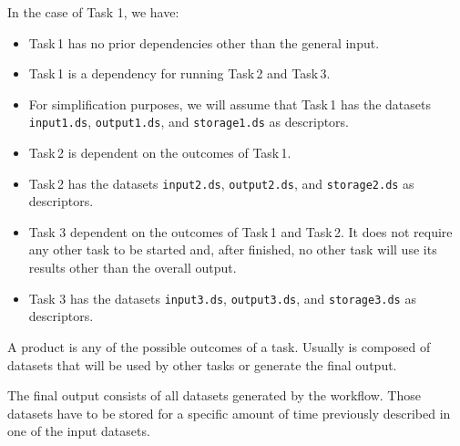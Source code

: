 \documentclass[a4paper]{article}
\begin{document}
{{{{\begin{description}
In the case of Task 1, we have:

\begin{itemize}

\item Task\,1 has no prior dependencies other than the general input.

\item Task\,1 is a dependency for running Task\,2 and Task\,3.

\item For simplification purposes, we will assume that Task\,1 has the datasets \texttt{input1.ds}, \texttt{output1.ds}, and \texttt{storage1.ds} as descriptors.

\end{itemize}

\item[Task 2]

\begin{itemize}

\item Task\,2 is dependent on the outcomes of Task\,1.

\item Task\,2 has the datasets \texttt{input2.ds}, \texttt{output2.ds}, and \texttt{storage2.ds} as descriptors.

\end{itemize}

\item[Task 3]

\begin{itemize}

\item Task 3 dependent on the outcomes of Task\,1 and Task\,2. It does not require any other task to be started and, after finished, no other task will use its results other than the overall output.

\item Task 3 has the datasets \texttt{input3.ds}, \texttt{output3.ds}, and \texttt{storage3.ds} as descriptors.

\end{itemize}

\item[Product]

A product is any of the possible outcomes of a task. Usually is composed of datasets that will be used by other tasks or generate the final output.

\item[Final Output]

The final output consists of all datasets generated by the workflow. Those datasets have to be stored for a specific amount of time previously described in one of the input datasets.


\end{description}}}}}
\end{document}
